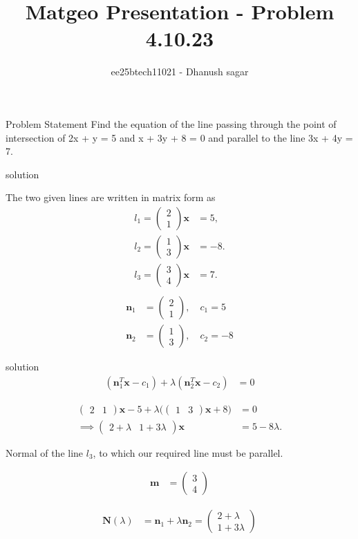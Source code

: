 \documentclass{beamer}
\title{Matgeo Presentation - Problem 4.10.23}
\author{ee25btech11021 - Dhanush sagar}
\numberwithin{equation}{section}
\theoremstyle{remark}
\newcommand{\myvec}[1]{\ensuremath{\begin{pmatrix}#1\end{pmatrix}}}
\let\vec\mathbf
\begin{document}
	

		




\begin{frame}
  \titlepage
\end{frame}

\begin{frame}{Problem Statement}
Find the equation of the line passing through the point of intersection of 2x + y = 5
and x + 3y + 8 = 0 and parallel to the line 3x + 4y = 7.
\end{frame}

\begin{frame}{solution}

The two given lines are written in matrix form as
\begin{align}
l_1 = \myvec{2 \\ 1}\vec{x} &= 5, \\
l_2 = \myvec{1 \\ 3}\vec{x} &= -8.\\
l_3 = \myvec{3 \\ 4}\vec{x} &= 7. \\
\end{align}
\begin{align}
\vec{n}_1 &= \myvec{2\\1}, \quad c_1=5 \\
\vec{n}_2 &= \myvec{1\\3}, \quad c_2=-8
\end{align}
\end{frame}
\begin{frame}{solution}
\begin{align}
(\vec{n}_1^T\vec{x}-c_1) + \lambda(\vec{n}_2^T\vec{x}-c_2) &= 0
\end{align}

\begin{align}
\myvec{2 & 1}\vec{x}-5 + \lambda\big(\myvec{1 & 3}\vec{x}+8\big) &= 0 \\
\implies \myvec{2+\lambda & 1+3\lambda}\vec{x} &= 5 - 8\lambda.  
\end{align}



Normal of the line $l_3$, to which our required line must be parallel.


\begin{align}
\vec{m} &= \myvec{3\\4}
\end{align}


\begin{align}
\vec{N}(\lambda) &= \vec{n}_1 + \lambda\vec{n}_2 = \myvec{2+\lambda\\1+3\lambda}
\end{align}
\end{frame}
\end{document}
